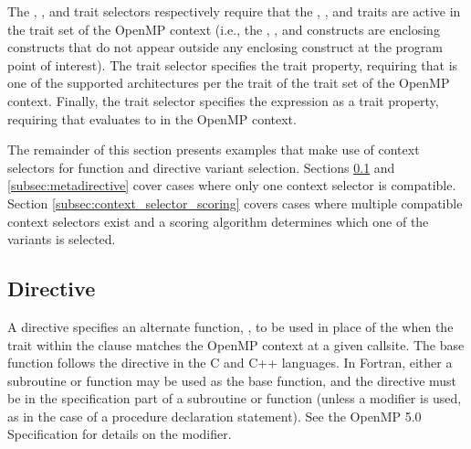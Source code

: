 The , , and  trait selectors
respectively require that the , , and  traits
are active in the  trait set of the OpenMP context (i.e., the
, , and  constructs are enclosing
constructs that do not appear outside any enclosing  construct at
the program point of interest). The  trait selector specifies the
 trait property, requiring that  is one of the
supported architectures per the  trait of the  trait set
of the OpenMP context. Finally, the  trait selector specifies
the  expression as a trait property, requiring that 
evaluates to  in the OpenMP context.

The remainder of this section presents examples that make use of context
selectors for function and directive variant selection. Sections
\ref{subsec:declare_variant} and \ref{subsec:metadirective} cover cases where
only one context selector is compatible. 
Section \ref{subsec:context_selector_scoring} covers cases where 
multiple compatible context selectors exist and a scoring algorithm 
determines which one of the variants is selected.

\subsection{ Directive}
\label{subsec:declare_variant}

A  directive specifies an alternate function, 
, to be used in place of the  
when the trait within the  clause matches the OpenMP context at a given callsite.
The base function follows the directive in the C and C++ languages.
In Fortran, either a subroutine or function may be used as the base function,
and the  directive must be in the specification 
part of a subroutine or function (unless a 
modifier is used, as in the case of a procedure declaration statement). See
the OpenMP 5.0 Specification for details on the modifier.

